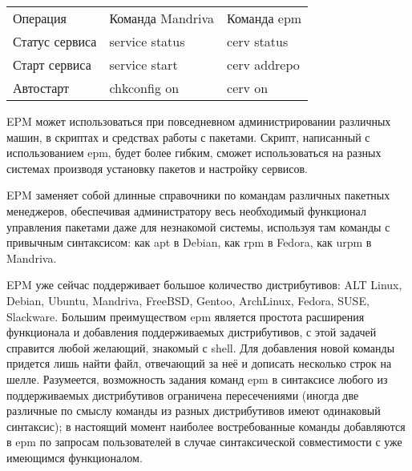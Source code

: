 \documentclass[10pt, a5paper]{article}
\begin{document}
\begin{table}
  \centering
  \begin{tabular}{ l l l }
    Операция & Команда Mandriva & Команда epm \\
    Статус сервиса & service status & cerv status \\
    Старт сервиса & service start & cerv addrepo \\
    Автостарт & chkconfig on & cerv on \\
  \end{tabular}
\end{table}
EPM может использоваться при повседневном администрировании различных машин, в скриптах и средствах работы с пакетами. Скрипт, написанный с использованием epm, будет более гибким, сможет использоваться на разных системах производя установку пакетов и настройку сервисов.

EPM заменяет собой длинные справочники по командам различных пакетных менеджеров, обеспечивая администратору весь необходимый функционал управления пакетами даже для незнакомой системы, используя там команды с привычным синтаксисом: как apt в Debian, как rpm в Fedora, как urpm в Mandriva.

EPM уже сейчас поддерживает большое количество дистрибутивов: ALT Linux, Debian, Ubuntu, Mandriva, FreeBSD, Gentoo, ArchLinux, Fedora, SUSE, Slackware. Большим преимуществом epm является простота расширения функционала и добавления поддерживаемых  дистрибутивов, с этой задачей справится любой желающий, знакомый с shell. Для добавления новой команды придется лишь найти файл, отвечающий за неё и дописать несколько строк на шелле.
Разумеется, возможность задания команд epm в синтаксисе любого из поддерживаемых дистрибутивов ограничена пересечениями (иногда две различные по смыслу команды из разных дистрибутивов имеют одинаковый синтаксис); в настоящий момент наиболее востребованные команды добавляются в epm по запросам пользователей в случае синтаксической совместимости с уже имеющимся функционалом.
\end{document}
